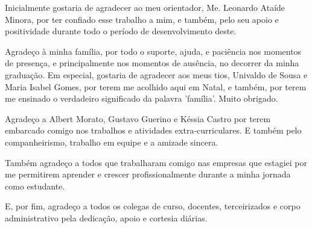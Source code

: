 %
%
%
%

\begin{agradecimentos}
Inicialmente gostaria de agradecer ao meu orientador, Me. Leonardo Ataíde Minora, por ter confiado esse trabalho a mim, e também, pelo seu apoio e positividade durante todo o período de desenvolvimento deste.

Agradeço à minha família, por todo o suporte, ajuda, e paciência nos momentos de presença, e principalmente nos momentos de ausência, no decorrer da minha graduação. Em especial, gostaria de agradecer aos meus tios, Univaldo de Sousa e Maria Isabel Gomes, por terem me acolhido aqui em Natal, e também, por terem me ensinado o verdadeiro significado da palavra 'família'. Muito obrigado.

Agradeço a Albert Morato, Gustavo Guerino e Késsia Castro por terem embarcado comigo nos trabalhos e atividades extra-curriculares. E também pelo companheirismo, trabalho em equipe e a amizade sincera.

Também agradeço a todos que trabalharam comigo nas empresas que estagiei por me permitirem aprender e crescer profissionalmente durante a minha jornada como estudante.

E, por fim, agradeço a todos os colegas de curso, docentes, terceirizados e corpo administrativo pela dedicação, apoio e cortesia diárias.
\end{agradecimentos}
